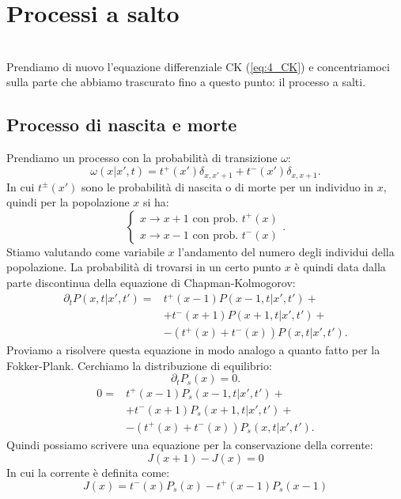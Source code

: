 \section{Processi a salto}%
\label{sub:Lezione 13}
\mylocaltoc \\
Prendiamo di nuovo l'equazione differenziale CK (\ref{eq:4_CK}) e concentriamoci sulla parte che abbiamo trascurato fino a questo punto: il processo a salti.
\subsection{Processo di nascita e morte}%
\label{sub:Processo di nascita e morte}
Prendiamo un processo con la probabilità di transizione $\omega$:
\[
    \omega (x|x',t) = t^+(x') \delta_{x,x'+1} + t^-(x') \delta_{x,x+1}
.\] 
In cui $t^{\pm}(x')$ sono le probabilità di nascita o di morte per un individuo in $x$, quindi per la popolazione $x$ si ha:
\[
    \begin{cases}
	x\to x+1  \text{ con prob. } t^+(x) \\
	x\to x-1 \text{ con prob. } t^-(x) 
    \end{cases}
.\] 
Stiamo valutando come variabile $x$ l'andamento del numero degli individui della popolazione.
La probabilità di trovarsi in un certo punto $x$ è quindi data dalla parte discontinua della equazione di Chapman-Kolmogorov:
\[\begin{aligned}
    \partial_{t}P\left(x,t|x',t'\right) =& t^+(x-1) P\left(x-1, t|x',t'\right) +\\
					 & + t^-(x+1)P(x+1, t| x',t') +\\
					 & - \left(t^+(x) + t^-(x) \right)P\left(x,t|x',t'\right)
.\end{aligned}\]
Proviamo a risolvere questa equazione in modo analogo a quanto fatto per la Fokker-Plank. Cerchiamo la distribuzione di equilibrio:
\[
    \partial_{t}P_s(x) = 0
.\] 
\[\begin{aligned}
    0 =& t^+(x-1) P_s\left(x-1, t|x',t'\right) +\\
       & + t^-(x+1)P_s(x+1, t| x',t') +\\
       & - \left(t^+(x) + t^-(x) \right)P_s\left(x,t|x',t'\right)
.\end{aligned}\]
Quindi possiamo scrivere una equazione per la conservazione della corrente:
\begin{equation}
    J(x+1) - J(x) = 0 \label{eq:13_curr}
\end{equation}
In cui la corrente è definita come:
\begin{equation}
    J(x) = t^-(x) P_s(x) - t^+(x-1) P_s(x-1) \label{eq:13_def_curr}
\end{equation}
